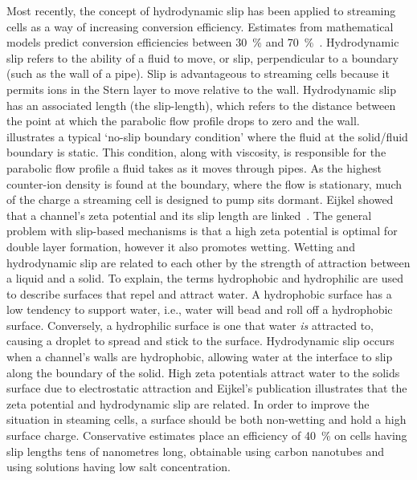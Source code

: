     Most recently, the concept of hydrodynamic slip has been applied to streaming cells as a way of increasing conversion efficiency.
    Estimates from mathematical models predict conversion efficiencies between \SI{30}{\percent} and \SI{70}{\percent}~\cite{Pennathur2007, Davidson2008a, Ren2008}.
    Hydrodynamic slip refers to the ability of a fluid to move, or slip, perpendicular to a boundary (such as the wall of a pipe).
    Slip is advantageous to streaming cells because it permits ions in the Stern layer to move relative to the wall.
    Hydrodynamic slip has an associated length (the slip-length), which refers to the distance between the point at which the parabolic flow profile drops to zero and the wall.
     illustrates a typical `no-slip boundary condition' where the fluid at the solid/fluid boundary is static.
    This condition, along with viscosity, is responsible for the parabolic flow profile a fluid takes as it moves through pipes.
    As the highest counter-ion density is found at the boundary, where the flow is stationary, much of the charge a streaming cell is designed to pump sits dormant.
    Eijkel showed that a channel's zeta potential and its slip length are linked~\cite{Eijkel2007}.
    The general problem with slip-based mechanisms is that a high zeta potential is optimal for double layer formation, however it also promotes wetting.
    Wetting and hydrodynamic slip are related to each other by the strength of attraction between a liquid and a solid.
    To explain, the terms hydrophobic and hydrophilic are used to describe surfaces that repel and attract water.
    A hydrophobic surface has a low tendency to support water, i.e., water will bead and roll off a hydrophobic surface.
    Conversely, a hydrophilic surface is one that water \emph{is} attracted to, causing a droplet to spread and stick to the surface.
    Hydrodynamic slip occurs when a channel's walls are hydrophobic, allowing water at the interface to slip along the boundary of the solid.
    High zeta potentials attract water to the solids surface due to electrostatic attraction and Eijkel's publication illustrates that the zeta potential and hydrodynamic slip are related.
    In order to improve the situation in steaming cells, a surface should be both non-wetting and hold a high surface charge.
    Conservative estimates place an efficiency of \SI{40}{\percent} on cells having slip lengths tens of nanometres long, obtainable using carbon nanotubes and using solutions having low salt concentration.


